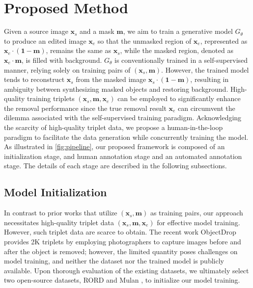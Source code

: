 \documentclass[10pt,twocolumn,letterpaper]{article}
\begin{document}
\section{Proposed Method}
\label{sec:methods}
Given a source image $\mathbf{x}_s$ and a mask $\mathbf{m}$, we aim to train a generative model $G_{\theta}$ to produce an edited image $\mathbf{x}_e$ so that the unmasked region of $\mathbf{x}_e$, represented as $\mathbf{x}_e \cdot (\mathbf{1}-\mathbf{m})$, remains the same as $\mathbf{x}_s$, while the masked region, denoted as $\mathbf{x}_e \cdot \mathbf{m}$, is filled with background. $G_{\theta}$ is conventionally trained in a self-supervised manner, relying solely on training pairs of $(\mathbf{x}_s,\mathbf{m})$. However, the trained model tends to reconstruct $\mathbf{x}_s$ from the masked image $\mathbf{x}_s \cdot (\mathbf{1-m})$, resulting in ambiguity between synthesizing masked objects and restoring background.
High-quality training triplets $(\mathbf{x}_s,\mathbf{m},\mathbf{x}_e)$ can be employed to significantly enhance the removal performance since the true removal result $\mathbf{x}_e$ can circumvent the dilemma associated with the self-supervised training paradigm. Acknowledging the scarcity of high-quality triplet data, we propose a human-in-the-loop paradigm to facilitate the data generation while concurrently training the model. As illustrated in \cref{fig:pipeline}, our proposed framework is composed of an initialization stage, and human annotation stage and an automated annotation stage. The details of each stage are described in the following subsections. 

\subsection{Model Initialization}

In contrast to prior works that utilize $(\mathbf{x}_s, \mathbf{m})$ as training pairs, our approach necessitates high-quality triplet data $(\mathbf{x}_s, \mathbf{m}, \mathbf{x}_e)$ for effective model training. However, such triplet data are scarce to obtain. 
The recent work ObjectDrop \cite{winter2024objectdrop} provides 2K triplets by employing photographers to capture images before and after the object is  removed; however, the limited quantity poses challenges on model training, and neither the dataset nor the trained model is publicly available. 
Upon thorough evaluation of the existing datasets, we ultimately select two open-source datasets, RORD \cite{sagong2022rord} and Mulan \cite{tudosiu2024mulan}, to initialize our model training. 
\end{document}

